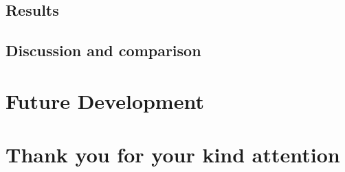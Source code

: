 \documentclass{beamer}
\begin{document}
\subsection{Results}
\begin{frame}
\end{frame}
\subsection{Discussion and comparison}
\begin{frame}
\end{frame}
\section{Future Development}
\begin{frame}
\end{frame}

\section*{Thank you for your kind attention}
\end{document}
